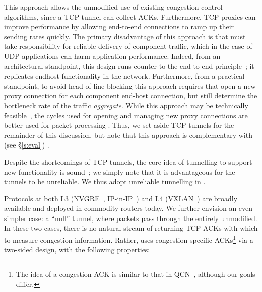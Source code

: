  This approach allows the unmodified use of existing congestion control algorithms, since a TCP tunnel can collect ACKs. Furthermore, TCP proxies can improve performance by allowing end-to-end connections to ramp up their sending rates quickly.
The primary disadvantage of this approach is that \name must take responsibility for reliable delivery of component traffic, which in the case of UDP applications can harm application performance. 
Indeed, from an architectural standpoint, this design runs counter to the end-to-end principle~\cite{e2e-principle}; it replicates endhost functionality in the network.
Furthermore, from a practical standpoint, to avoid head-of-line blocking this approach requires that \name open a new proxy connection for each component end-host connection, but still determine the bottleneck rate of the traffic \emph{aggregate}. While this approach may be technically feasible~\cite{cm}, the cycles used for opening and managing new proxy connections are better used for packet processing .
Thus, we set aside TCP tunnels for the remainder of this discussion, but note that this approach is complementary with \name (see \S\ref{s:eval}) .

Despite the shortcomings of TCP tunnels, the core idea of tunnelling to support new functionality is sound~\cite{trotsky}; we simply note that it is advantageous for the tunnels to be unreliable. We thus adopt unreliable tunnelling in \name.

 Protocols at both L3 (\eg NVGRE~\cite{nvgre}, IP-in-IP~\cite{ipinip}) and L4 (\eg VXLAN~\cite{vxlan}) are broadly available and deployed in commodity routers today. We further envision an even simpler case: a ``null'' tunnel, where packets pass through the \inbox entirely unmodified.
In these two cases, there is no natural stream of returning TCP ACKs with which to measure congestion information. 
Rather, \name uses congestion-specific ACKs\footnote{The idea of a congestion ACK is similar to that in QCN~\cite{qcn}, although our goals differ.} via a two-sided design, with the following properties:

